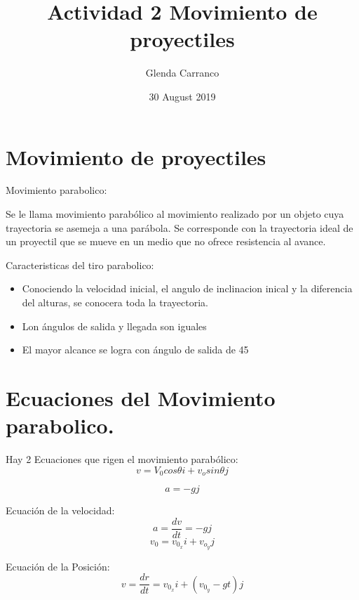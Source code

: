 \documentclass{article}
\title{Actividad 2 Movimiento de proyectiles}
\author{ Glenda Carranco}
\date{ 30 August 2019}
\begin{document}
\maketitle

\section{Movimiento de proyectiles}

Movimiento parabolico:

Se le llama movimiento parabólico al movimiento realizado por un objeto cuya trayectoria se asemeja a una parábola. Se corresponde con la trayectoria ideal de un proyectil que se mueve en un medio que no ofrece resistencia al avance.

Caracteristicas del tiro parabolico:

\begin{itemize}
    \item Conociendo la velocidad inicial, el angulo de inclinacion inical y la diferencia del alturas, se conocera toda la trayectoria.
    \item Lon ángulos de salida y llegada son iguales
    \item El mayor alcance se logra con ángulo de salida de 45
\end{itemize}
 
 
 
 \section{Ecuaciones del Movimiento parabolico.}
 Hay 2 Ecuaciones que rigen el movimiento parabólico:
\begin{equation}
          v=V_0 cos\theta i + v_o sin\theta j
         \end{equation}
          
\begin{equation}
              a=-gj
\end{equation}

Ecuación de la velocidad:
\begin{equation}
a = \frac{dv}{dt} = -gj
    \end{equation}
    \begin{equation}
        v_0 = v_0_x i + v_o_y j
    \end{equation}

Ecuación de la Posición:
\begin{equation}
    v = \frac{dr}{dt} = v_0_x i + (v_0_y - gt)j
\end{equation}
\end{document}
